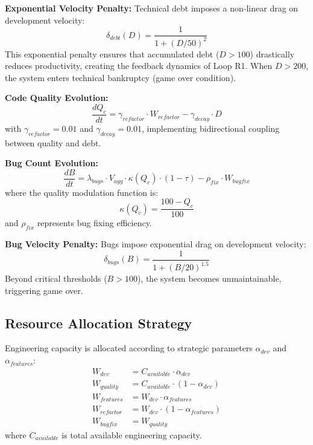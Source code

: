 \documentclass[alpha-refs]{wiley-article}
\begin{document}
\textbf{Exponential Velocity Penalty:}
Technical debt imposes a non-linear drag on development velocity:
\begin{equation}
\delta_{debt}(D) = \frac{1}{1 + (D/50)^2}
\end{equation}
This exponential penalty ensures that accumulated debt ($D > 100$) drastically reduces productivity, creating the feedback dynamics of Loop R1. When $D > 200$, the system enters technical bankruptcy (game over condition).

\textbf{Code Quality Evolution:}
\begin{equation}
\frac{dQ_c}{dt} = \gamma_{refactor} \cdot W_{refactor} - \gamma_{decay} \cdot D
\end{equation}
with $\gamma_{refactor} = 0.01$ and $\gamma_{decay} = 0.01$, implementing bidirectional coupling between quality and debt.

\textbf{Bug Count Evolution:}
\begin{equation}
\frac{dB}{dt} = \lambda_{bugs} \cdot V_{agg} \cdot \kappa(Q_c) \cdot (1 - \tau) - \rho_{fix} \cdot W_{bugfix}
\end{equation}
where the quality modulation function is:
\begin{equation}
\kappa(Q_c) = \frac{100 - Q_c}{100}
\end{equation}
and $\rho_{fix}$ represents bug fixing efficiency.

\textbf{Bug Velocity Penalty:}
Bugs impose exponential drag on development velocity:
\begin{equation}
\delta_{bugs}(B) = \frac{1}{1 + (B/20)^{1.5}}
\end{equation}
Beyond critical thresholds ($B > 100$), the system becomes unmaintainable, triggering game over.

\subsection{Resource Allocation Strategy}

Engineering capacity is allocated according to strategic parameters $\alpha_{dev}$ and $\alpha_{features}$:
\begin{align}
W_{dev} &= C_{available} \cdot \alpha_{dev} \\
W_{quality} &= C_{available} \cdot (1 - \alpha_{dev}) \\
W_{features} &= W_{dev} \cdot \alpha_{features} \\
W_{refactor} &= W_{dev} \cdot (1 - \alpha_{features}) \\
W_{bugfix} &= W_{quality}
\end{align}
where $C_{available}$ is total available engineering capacity.
\end{document}
